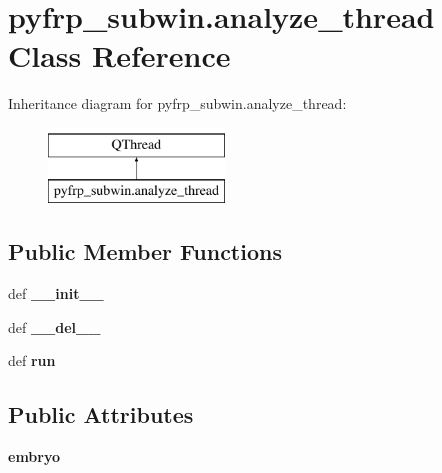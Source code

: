 \hypertarget{classpyfrp__subwin_1_1analyze__thread}{\section{pyfrp\+\_\+subwin.\+analyze\+\_\+thread Class Reference}
\label{classpyfrp__subwin_1_1analyze__thread}
}
Inheritance diagram for pyfrp\+\_\+subwin.\+analyze\+\_\+thread\+:\begin{figure}[H]
\begin{center}
\leavevmode
\includegraphics[height=2.000000cm]{classpyfrp__subwin_1_1analyze__thread}
\end{center}
\end{figure}
\subsection*{Public Member Functions}
\begin{DoxyCompactItemize}
\item 
\hypertarget{classpyfrp__subwin_1_1analyze__thread_a7024f889bbc687ca1dccb843d4580f25}{def {\bfseries \+\_\+\+\_\+init\+\_\+\+\_\+}}\label{classpyfrp__subwin_1_1analyze__thread_a7024f889bbc687ca1dccb843d4580f25}

\item 
\hypertarget{classpyfrp__subwin_1_1analyze__thread_aca9448e77c769805eacba8fdae872bd2}{def {\bfseries \+\_\+\+\_\+del\+\_\+\+\_\+}}\label{classpyfrp__subwin_1_1analyze__thread_aca9448e77c769805eacba8fdae872bd2}

\item 
\hypertarget{classpyfrp__subwin_1_1analyze__thread_aeda52ff84426e5f8ac275425749d381b}{def {\bfseries run}}\label{classpyfrp__subwin_1_1analyze__thread_aeda52ff84426e5f8ac275425749d381b}

\end{DoxyCompactItemize}
\subsection*{Public Attributes}
\begin{DoxyCompactItemize}
\item 
\hypertarget{classpyfrp__subwin_1_1analyze__thread_a2d3d122beee61b4ab632a3ea50d2b39e}{{\bfseries embryo}}\label{classpyfrp__subwin_1_1analyze__thread_a2d3d122beee61b4ab632a3ea50d2b39e}

\end{DoxyCompactItemize}
